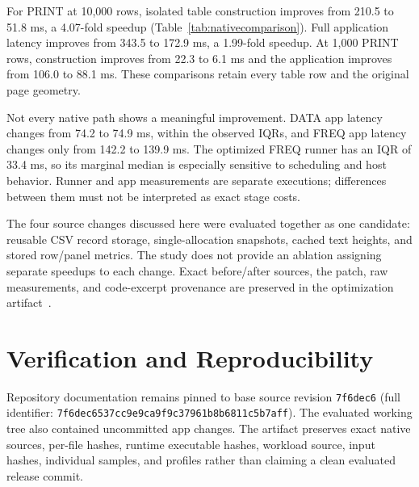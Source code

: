 \documentclass[11pt,a4paper]{article}
\newcommand{\localstatrevision}{7f6dec6537cc9e9ca9f9c37961b8b6811c5b7aff}
\begin{document}
\begin{table}[tbp]
\centering\footnotesize

\caption{Counterbalanced native comparison in milliseconds:
median (IQR width), fifteen measured observations per build and
path. The layout path constructs a table view from preloaded
results and excludes execution, decoding, and drawing.}
\label{tab:nativecomparison}
\end{table}

For PRINT at 10,000 rows, isolated table construction improves
from 210.5 to 51.8 ms, a 4.07-fold speedup
(Table~\ref{tab:nativecomparison}). Full application latency
improves from 343.5 to 172.9 ms, a 1.99-fold speedup. At 1,000
PRINT rows, construction improves from 22.3 to 6.1 ms and the
application improves from 106.0 to 88.1 ms. These comparisons
retain every table row and the original page geometry.

Not every native path shows a meaningful improvement. DATA app
latency changes from 74.2 to 74.9 ms, within the observed IQRs,
and FREQ app latency changes only from 142.2 to 139.9 ms. The
optimized FREQ runner has an IQR of 33.4 ms, so its marginal
median is especially sensitive to scheduling and host behavior.
Runner and app measurements are separate executions; differences
between them must not be interpreted as exact stage costs.

The four source changes discussed here were evaluated together
as one candidate: reusable CSV record storage, single-allocation
snapshots, cached text heights, and stored row/panel metrics.
The study does not provide an ablation assigning separate speedups
to each change. Exact before/after sources, the patch, raw
measurements, and code-excerpt provenance are preserved in the
optimization artifact~\cite{optimization}.

\section{Verification and Reproducibility}

Repository documentation remains pinned to base source revision
\texttt{7f6dec6} (full identifier:
\texttt{\localstatrevision}). The evaluated working tree also
contained uncommitted app changes. The artifact preserves exact
native sources, per-file hashes, runtime executable hashes,
workload source, input hashes, individual samples, and profiles
rather than claiming a clean evaluated release commit.
\end{document}
